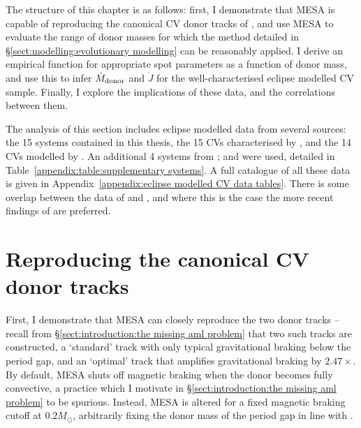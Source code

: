 
\label{chpt:Mass loss and Angular momentum loss in short period CVs} %

The structure of this chapter is as follows: first, I demonstrate that MESA is capable of reproducing the canonical CV donor tracks of \citet{knigge11}, and use MESA to evaluate the range of donor masses for which the method detailed in \S\ref{sect:modelling:evolutionary modelling} can be reasonably applied. I derive an empirical function for appropriate spot parameters as a function of donor mass, and use this to infer $\dot M_{\rm donor}$ and $\dot J$ for the well-characterised eclipse modelled CV sample.
Finally, I explore the implications of these data, and the correlations between them.

The analysis of this section includes eclipse modelled data from several sources: the 15 systems contained in this thesis, the 15 CVs characterised by \citet{McAllister2019}, and the 14 CVs modelled by \citet{Savoury2011}. An additional 4 systems from \citet{mcallister2015,mcallister2017, mcallister2017b}; and \citet{copperwheat2010} were used, detailed in Table~\ref{appendix:table:supplementary systems}. A full catalogue of all these data is given in Appendix~\ref{appendix:eclipse modelled CV data tables}.
There is some overlap between the data of \citet{McAllister2019} and \citet{Savoury2011}, and where this is the case the more recent findings of \citet{McAllister2019} are preferred.


\section{Reproducing the canonical CV donor tracks}
\label{sect:results:reproducing K11 tracks}

First, I demonstrate that MESA can closely reproduce the two \citet{knigge11} donor tracks -- recall from \S\ref{sect:introduction:the missing aml problem} that two such tracks are constructed, a `standard' track with only typical gravitational braking below the period gap, and an `optimal' track that amplifies gravitational braking by $2.47\times$.
By default, MESA shuts off magnetic braking when the donor becomes fully convective, a practice which I motivate in \S\ref{sect:introduction:the missing aml problem} to be spurious. Instead, MESA is altered for a fixed magnetic braking cutoff at $0.2 M_\odot$, arbitrarily fixing the donor mass of the period gap in line with \citet{knigge11}.

